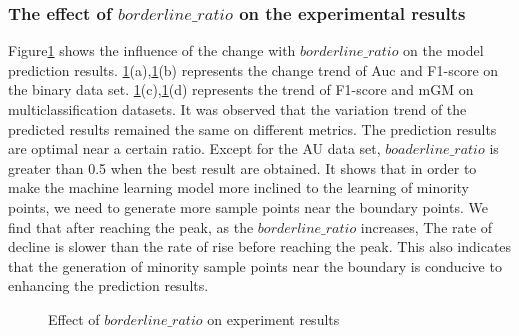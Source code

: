 \documentclass[runningheads]{llncs}
\begin{document}
\subsubsection{The effect of $borderline\_ratio$ on the experimental results}
Figure\ref{fig13} shows the influence of the change with $borderline\_ratio$
on the model prediction results.
\ref{fig13}(a),\ref{fig13}(b) represents the change trend of Auc and F1-score on the binary data set. 
\ref{fig13}(c),\ref{fig13}(d) represents the trend of F1-score and mGM on multiclassification datasets. 
It was observed that the variation trend of the predicted results remained the same on different metrics. 
The prediction results are optimal near a certain ratio.
Except for the AU data set, $boaderline\_ratio$ is greater than 0.5 when the best result are obtained. 
It shows that in order to make the machine learning model more inclined to the learning of minority points, 
we need to generate more sample points near the boundary points.
We find that after reaching the peak, as the $borderline\_ratio$ increases,
The rate of decline is slower than the rate of rise before reaching the peak.
This also indicates that the generation of minority sample 
points near the boundary is conducive to enhancing the prediction results.
\begin{figure}[htbp]
  \centering
  \quad
  
  \quad
  \quad
  \caption{Effect of $borderline\_ratio$ on experiment results}
  \label{fig13}
  \end{figure}
\end{document}
